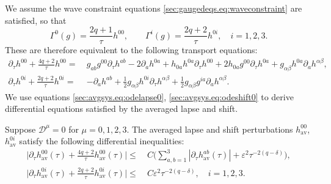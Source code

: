 \documentclass{article}
\newcommand{\av}{\mathrm{av}}
\newcommand{\mc}{\mathcal}
\newcommand{\ve}{\varepsilon}
\newcommand{\pa}{\partial}
\begin{document}
We assume the wave constraint equations \eqref{sec:gaugedeqs.eq:waveconstraint} are satisfied, so that
\begin{equation}
    \Gamma^0(g) = \frac{2q+1}{\tau}h^{00},\qquad \Gamma^i(g) = \frac{2q+2}{\tau} h^{0i},\quad  i = 1,2,3.
\end{equation}
These are therefore equivalent to the following transport equations:
\begin{subequations}
    \begin{align}
        \pa_\tau  h^{00} + \frac{4q+2}{\tau} h^{00} = \>& g_{ab}g^{00}\pa_\tau  h^{ab}-2\pa_a  h^{0a} + h_{0a} h^{0a}\pa_\tau  h^{00} + 2 h_{0a}g^{00}\pa_\tau  h^{0a}+g_{\alpha\beta} h^{0a}\pa_a  h^{\alpha\beta},\label{sec:avgsys.eq:odelapse0}\\
        \pa_\tau  h^{0i} + \frac{2q+2}{\tau} h^{0i} = \>& -\pa_a  h^{ab} +\frac{1}{2}g_{\alpha\beta} h^{0i}\pa_\tau  h^{\alpha\beta} +\frac{1}{2}g_{\alpha\beta}g^{ia}\pa_a  h^{\alpha\beta}.\label{sec:avgsys.eq:odeshift0}
    \end{align}
\end{subequations}
We use equations \eqref{sec:avgsys.eq:odelapse0}, \eqref{sec:avgsys.eq:odeshift0} to derive differential equations satisfied by the averaged lapse and shift.
\begin{lemma}\label{sec:avgsys.lem:odelapseshift}
    Suppose $\mc{D}^{\mu}=0$ for $\mu = 0,1,2,3$. The averaged lapse and shift perturbations $h_{\av}^{00}$, $h_{\av}^{0i}$ satisfy the following differential inequalities:
    \begin{subequations}
        \begin{align}
            \Big|\pa_\tau  h_{\av}^{00}(\tau) + \frac{4q+2}{\tau}h_{\av}^{00}(\tau)\Big| \leq&\> C\Big(\sum_{a,b=1}^3|\pa_\tau h_{\av}^{ab}(\tau)| + \ve^2 \tau^{-2(q-\delta)}\Big),\label{sec:avgsys.eq:odeavglapse}\\
            \Big|\pa_\tau   h_{\av}^{0i}(\tau) + \frac{2q+2}{\tau}  h_{\av}^{0i}(\tau)\Big| \leq&\> C\ve^2\tau^{-2(q-\delta)},\quad i=1,2,3.\label{sec:avgsys.eq:odeavgshift}
        \end{align}
    \end{subequations}
\end{lemma}
\end{document}
